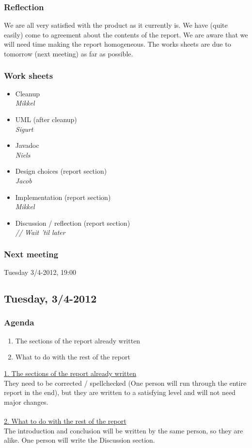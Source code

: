 \documentclass[a4paper,11pt]{article}
\begin{document}
\subsubsection*{Reflection}
We are all very satisfied with the product as it currently is.
We have (quite easily) come to agreement about the contents of the report.
We are aware that we will need time making the report homogeneous.
The works sheets are due to tomorrow (next meeting) as far as possible.

\subsubsection*{Work sheets}
\begin{itemize}
	\item Cleanup \\
		\textsl{Mikkel}
	\item UML (after cleanup) \\
		\textsl{Sigurt}
	\item Javadoc \\
		\textsl{Niels}
	\item Design choices (report section) \\
		\textsl{Jacob}
	\item Implementation (report section) \\
		\textsl{Mikkel}
	\item Discussion / reflection (report section) \\
		\textsl{// Wait 'til later}
\end{itemize}

\subsubsection*{Next meeting}
Tuesday 3/4-2012, 19:00


\pagebreak
\subsection{Tuesday, 3/4-2012}

\subsubsection*{Agenda}
\begin{enumerate}
	\item The sections of the report already written
	\item What to do with the rest of the report
\end{enumerate}
\underline{1. The sections of the report already written} \\
They need to be corrected / spellchecked (One person will run through the entire report in the end), but they are written to a satisfying level and will not need major changes. \\ \\
\underline{2. What to do with the rest of the report} \\
The introduction and conclusion will be written by the same person, so they are alike. One person will write the Discussion section.
\end{document}
